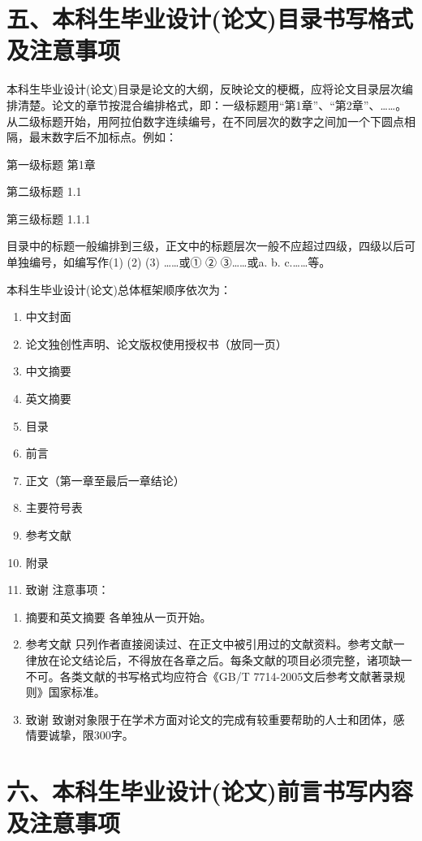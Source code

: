 \documentclass{cupb-thesis}
\begin{document}
\section{五、本科生毕业设计(论文)目录书写格式及注意事项}

本科生毕业设计(论文)目录是论文的大纲，反映论文的梗概，应将论文目录层次编排清楚。论文的章节按混合编排格式，即：一级标题用“第1章”、“第2章”、……。从二级标题开始，用阿拉伯数字连续编号，在不同层次的数字之间加一个下圆点相隔，最末数字后不加标点。例如：

第一级标题  第1章

第二级标题  1.1

第三级标题  1.1.1

目录中的标题一般编排到三级，正文中的标题层次一般不应超过四级，四级以后可单独编号，如编写作(1) (2) (3) ……或① ② ③……或a. b. c.……等。

本科生毕业设计(论文)总体框架顺序依次为：

\begin{enumerate}[label=（\arabic*）]
  \item 中文封面
  \item 论文独创性声明、论文版权使用授权书（放同一页）
  \item 中文摘要
  \item 英文摘要
  \item 目录
  \item 前言
  \item 正文（第一章至最后一章结论）
  \item 主要符号表
  \item 参考文献
  \item 附录
  \item 致谢
注意事项：

\end{enumerate}
\begin{enumerate}[label=\arabic*.]
  \item 摘要和英文摘要  各单独从一页开始。
  \item 参考文献  只列作者直接阅读过、在正文中被引用过的文献资料。参考文献一律放在论文结论后，不得放在各章之后。每条文献的项目必须完整，诸项缺一不可。各类文献的书写格式均应符合《GB/T 7714-2005文后参考文献著录规则》国家标准。
  \item 致谢  致谢对象限于在学术方面对论文的完成有较重要帮助的人士和团体，感情要诚挚，限300字。
\end{enumerate}
\section{六、本科生毕业设计(论文)前言书写内容及注意事项}
\end{document}
